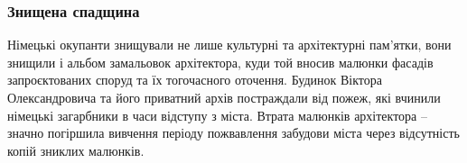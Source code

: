  
 
 
 
 

\subsubsection{Знищена спадщина}

Німецькі окупанти знищували не лише культурні та архітектурні пам'ятки, вони
знищили і альбом замальовок архітектора, куди той вносив малюнки фасадів
запроєктованих споруд та їх тогочасного оточення. Будинок Віктора
Олександровича та його приватний архів постраждали від пожеж, які вчинили
німецькі загарбники в часи відступу з міста. Втрата малюнків архітектора –
значно погіршила вивчення періоду пожвавлення забудови міста через відсутність
копій зниклих малюнків.
